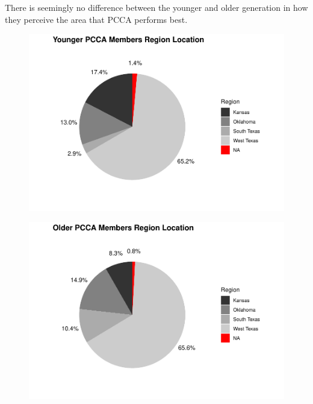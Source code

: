 \documentclass[a4paper]{article}
\begin{document}
There is seemingly no difference between the younger and older generation in how they perceive the area that PCCA performs best.

\noindent\begin{minipage}{0.5\textwidth}
	\begin{figure}[H]
		\includegraphics[scale=0.5]{survey/pcca_survey_files/figure-latex/region-young-1.pdf}
	\end{figure}
\end{minipage}%
\begin{minipage}{0.5\textwidth}
	\begin{figure}[H]
		\includegraphics[scale=0.5]{survey/pcca_survey_files/figure-latex/region-old-1.pdf}
	\end{figure}
\end{minipage}
\end{document}
